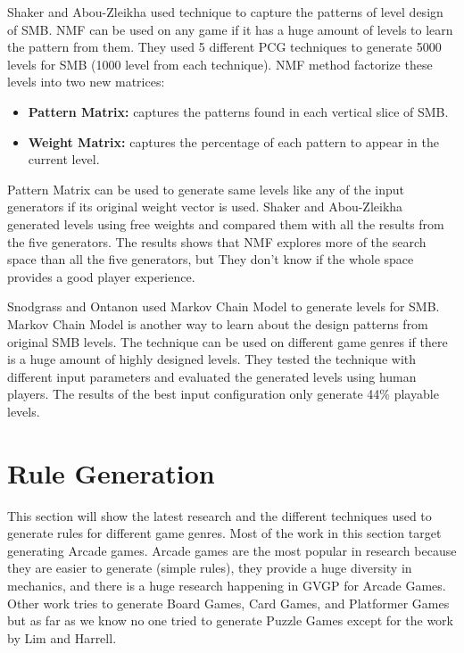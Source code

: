 Shaker and Abou-Zleikha\cite{nmfSuperMarioBros} used  technique to capture the patterns of level design of SMB. NMF can be used on any game if it has a huge amount of levels to learn the pattern from them. They used 5 different PCG techniques to generate 5000 levels for SMB (1000 level from each technique). NMF method factorize these levels into two new matrices:
\begin{itemize} \itemsep0pt \parskip0pt 
	\item \textbf{Pattern Matrix:} captures the patterns found in each vertical slice of SMB.
	\item \textbf{Weight Matrix:} captures the percentage of each pattern to appear in the current level.
\end{itemize}
Pattern Matrix can be used to generate same levels like any of the input generators if its original weight vector is used. Shaker and Abou-Zleikha generated levels using free weights and compared them with all the results from the five generators. The results shows that NMF explores more of the search space than all the five generators, but They don't know if the whole space provides a good player experience.\\\par

Snodgrass and Ontanon\cite{markovSuperMarioBros} used Markov Chain Model to generate levels for SMB. Markov Chain Model is another way to learn about the design patterns from original SMB levels. The technique can be used on different game genres if there is a huge amount of highly designed levels. They tested the technique with different input parameters and evaluated the generated levels using human players. The results of the best input configuration only generate 44\% playable levels.

\section{Rule Generation}
This section will show the latest research and the different techniques used to generate rules for different game genres. Most of the work in this section target generating Arcade games\cite{arcadeHillClimber, cookArcadeGames, romCheckFail, variationForever, gameOMatic}. Arcade games are the most popular in research because they are easier to generate (simple rules), they provide a huge diversity in mechanics, and there is a huge research happening in GVGP for Arcade Games\cite{gvgp}. Other work tries to generate Board Games\cite{evolveBrowne}, Card Games\cite{generationCardGames}, and Platformer Games\cite{mechanicMiner} but as far as we know no one tried to generate Puzzle Games except for the work by Lim and Harrell\cite{puzzleScriptGeneration}.

